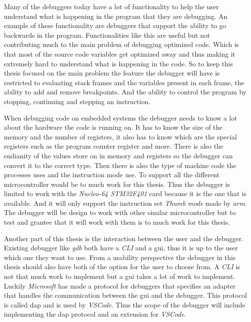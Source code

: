 Many of the debuggers today have a lot of functionality to help the user understand what is happening in the program that they are debugging.
An example of these functionality are debuggers that support the ability to go backwards in the program.
Functionalities like this are useful but not contributing much to the main problem of debugging optimized code.
Which is that most of the source code variables get optimized away and thus making it extremely hard to understand what is happening in the code.
So to keep this thesis focused on the main problem the feature the debugger will have is restricted to evaluating stack frames and the variables present in each frame, the ability to add and remove breakpoints.
And the ability to control the program by stopping, continuing and stepping an instruction.


When debugging code on embedded systems the debugger needs to know a lot about the hardware the code is running on.
It has to know the size of the memory and the number of registers, it also has to know which are the special registers such as the program counter register and more.
There is also the endianity of the values store on in memory and registers so the debugger can convert it to the correct type.
Then there is also the type of machine code the processes uses and the instruction mode use.
To support all the different microcontroller would be to much work for this thesis.
Thus the debugger is limited to work with the \emph{Nucleo-64 STM32F401} card because it is the one that is available.
And it will only support the instruction set \emph{Thumb mode} made by \emph{arm}.
The debugger will be design to work with other similar microcontroller but to test and grantee that it will work with them is to much work for this thesis.


Another part of this thesis is the interaction between the user and the debugger.
Existing debugger like \emph{gdb} both have a \emph{CLI} and a \acrfull{gui}, thus it is up to the user which one they want to use.
From a usability perspective the debugger in this thesis should also have both of the option for the user to choose from.
A \emph{CLI} is not that much work to implement but a \acrshort{gui} takes a lot of work to implement.
Luckily \emph{Microsoft} has made a protocol for debuggers that specifies an adapter that handles the communication between the \acrshort{gui} and the debugger.
This protocol is called \acrfull{dap} and is used by \emph{VSCode}.
Thus the scope of the debugger will include implementing the \acrshort{dap} protocol and an extension for \emph{VSCode}.


